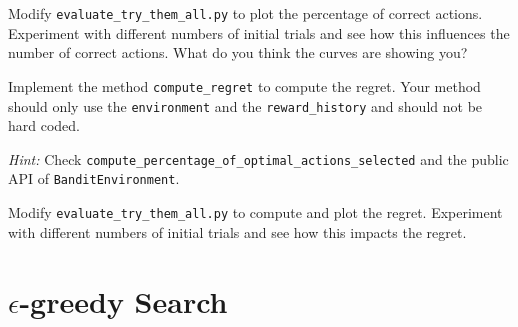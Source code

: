 \documentclass[twoside]{ucl_exam}
\begin{document}
\begin{question}

\begin{subquestion}

Modify \texttt{evaluate\_try\_them\_all.py} to plot the percentage of
correct actions. Experiment with different numbers of initial trials
and see how this influences the number of correct actions. What do you
think the curves are showing you?

\end{subquestion}

\begin{subquestion}

Implement the method \texttt{compute\_regret} to compute the
regret. Your method should only use the \texttt{environment} and the
\texttt{reward\_history} and should not be hard coded.

\emph{Hint:} Check
\texttt{compute\_percentage\_of\_optimal\_actions\_selected} and the
public API of \texttt{BanditEnvironment}.

\end{subquestion}

\begin{subquestion}

Modify \texttt{evaluate\_try\_them\_all.py} to compute and plot the regret.
Experiment with different numbers of initial trials and see how this impacts the
regret.

\end{subquestion}

\end{question}

\section*{$\epsilon$-greedy Search}
\end{document}
